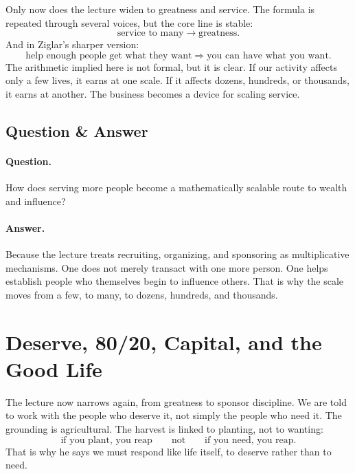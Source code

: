 Only now does the lecture widen to greatness and service. The formula is repeated through several voices, but the core line is stable:
\begin{equation}
\text{service to many} \longrightarrow \text{greatness}.
\end{equation}
And in Ziglar's sharper version:
\begin{equation}
\text{help enough people get what they want}
\Longrightarrow
\text{you can have what you want}.
\end{equation}
The arithmetic implied here is not formal, but it is clear. If our activity affects only a few lives, it earns at one scale. If it affects dozens, hundreds, or thousands, it earns at another. The business becomes a device for scaling service.

\subsection{Question \& Answer}

\paragraph{Question.} How does serving more people become a mathematically scalable route to wealth and influence?

\paragraph{Answer.} Because the lecture treats recruiting, organizing, and sponsoring as multiplicative mechanisms. One does not merely transact with one more person. One helps establish people who themselves begin to influence others. That is why the scale moves from a few, to many, to dozens, hundreds, and thousands.

\section{Deserve, 80/20, Capital, and the Good Life}

The lecture now narrows again, from greatness to sponsor discipline. We are told to work with the people who deserve it, not simply the people who need it. The grounding is agricultural. The harvest is linked to planting, not to wanting:
\begin{equation}
\text{if you plant, you reap}
\qquad\text{not}\qquad
\text{if you need, you reap}.
\end{equation}
That is why he says we must respond like life itself, to deserve rather than to need.

